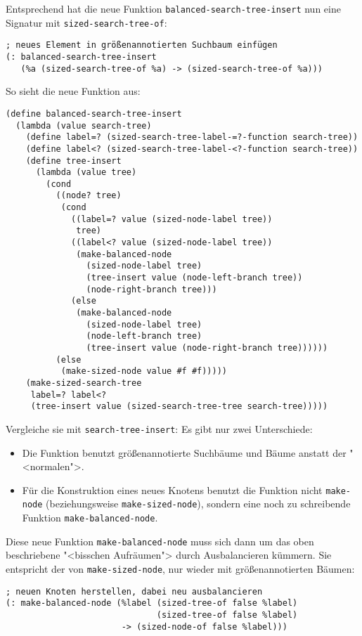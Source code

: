 Entsprechend hat die neue Funktion
\lstinline{balanced-search-tree-insert} nun eine Signatur mit
\lstinline{sized-search-tree-of}:
%
\begin{lstlisting}
; neues Element in größenannotierten Suchbaum einfügen
(: balanced-search-tree-insert
   (%a (sized-search-tree-of %a) -> (sized-search-tree-of %a)))
\end{lstlisting}
%
So sieht die neue Funktion aus:
%
\begin{lstlisting}
(define balanced-search-tree-insert
  (lambda (value search-tree)
    (define label=? (sized-search-tree-label-=?-function search-tree))
    (define label<? (sized-search-tree-label-<?-function search-tree))
    (define tree-insert
      (lambda (value tree)
        (cond
          ((node? tree)
           (cond
             ((label=? value (sized-node-label tree))
              tree)
             ((label<? value (sized-node-label tree))
              (make-balanced-node
                (sized-node-label tree)
                (tree-insert value (node-left-branch tree))
                (node-right-branch tree)))
             (else
              (make-balanced-node
                (sized-node-label tree)
                (node-left-branch tree)
                (tree-insert value (node-right-branch tree))))))
          (else
           (make-sized-node value #f #f)))))
    (make-sized-search-tree
     label=? label<?
     (tree-insert value (sized-search-tree-tree search-tree)))))
\end{lstlisting}
%
Vergleiche sie mit \lstinline{search-tree-insert}: Es gibt nur zwei
Unterschiede:
%
\begin{itemize}
\item Die Funktion benutzt größenannotierte Suchbäume und Bäume
  anstatt der "<normalen">.
\item Für die Konstruktion eines neues Knotens benutzt die Funktion
  nicht \lstinline{make-node} (beziehungsweise
  \lstinline{make-sized-node}), sondern eine noch zu schreibende
  Funktion \lstinline{make-balanced-node}.
\end{itemize}
%
Diese neue Funktion \lstinline{make-balanced-node} muss sich dann um
das oben beschriebene "<bisschen Aufräumen"> durch Ausbalancieren
kümmern.  Sie entspricht der von \lstinline{make-sized-node}, nur
wieder mit größenannotierten Bäumen:
%
\begin{lstlisting}
; neuen Knoten herstellen, dabei neu ausbalancieren
(: make-balanced-node (%label (sized-tree-of false %label)
                              (sized-tree-of false %label)
                       -> (sized-node-of false %label)))
\end{lstlisting}
